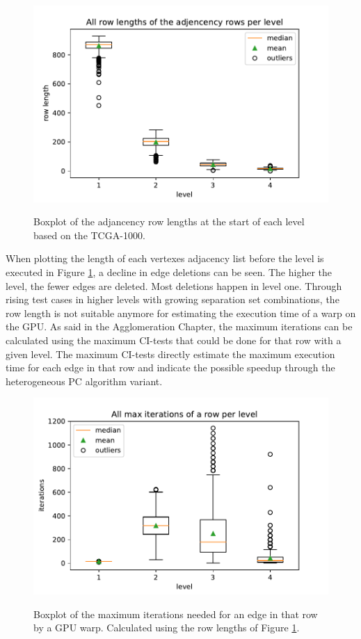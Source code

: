 \begin{figure}[H]
  \caption{Boxplot of the adjancency row lengths at the start of each level based on the TCGA-1000.}
  \includegraphics[width=\textwidth]{figures/rowlength_bxplt.pdf}
  \centering
  \label{fig:rowlength_bxplt}
\end{figure}

When plotting the length of each vertexes adjacency list before the level is executed in Figure \ref{fig:rowlength_bxplt}, a decline in edge deletions can be seen. The higher the level, the fewer edges are deleted. Most deletions happen in level one. Through rising test cases in higher levels with growing separation set combinations, the row length is not suitable anymore for estimating the execution time of a warp on the GPU. As said in the Agglomeration Chapter, the maximum iterations can be calculated using the maximum CI-tests that could be done for that row with a given level. The maximum CI-tests directly estimate the maximum execution time for each edge in that row and indicate the possible speedup through the heterogeneous PC algorithm variant.

\begin{figure}[H]
  \caption{Boxplot of the maximum iterations needed for an edge in that row by a GPU warp. Calculated using the row lengths of Figure \ref{fig:rowlength_bxplt}.}
  \includegraphics[width=\textwidth]{figures/iterations_bxplt.pdf}
  \centering
  \label{fig:iterations_bxplt}
\end{figure}

